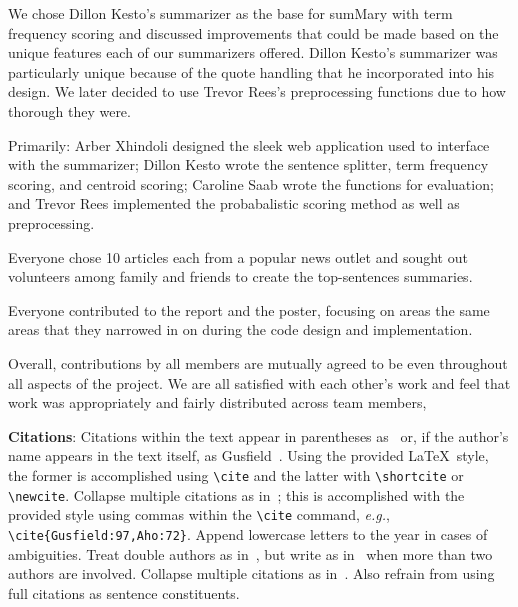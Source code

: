 \documentclass[11pt,a4paper]{article}
\begin{document}
We chose Dillon Kesto's summarizer as the base for sumMary with term frequency scoring and discussed improvements that could be made based on the unique features each of our summarizers offered. Dillon Kesto's summarizer was particularly unique because of the quote handling that he incorporated into his design. We later decided to use Trevor Rees's preprocessing functions due to how thorough they were.

Primarily: Arber Xhindoli designed the sleek web application used to interface with the summarizer; Dillon Kesto wrote the sentence splitter, term frequency scoring, and centroid scoring; Caroline Saab wrote the functions for evaluation; and Trevor Rees implemented the probabalistic scoring method as well as preprocessing.

Everyone chose 10 articles each from a popular news outlet and sought out volunteers among family and friends to create the top-sentences summaries.

Everyone contributed to the report and the poster, focusing on areas the same areas that they narrowed in on during the code design and implementation.

Overall, contributions by all members are mutually agreed to be even throughout all aspects of the project. We are all satisfied with each other's work and feel that work was appropriately and fairly distributed across team members,






















{\bf Citations}: Citations within the text appear in parentheses
as~\cite{Gusfield:97} or, if the author's name appears in the text
itself, as Gusfield~.
Using the provided \LaTeX\ style, the former is accomplished using
{\small\verb|\cite|} and the latter with {\small\verb|\shortcite|} or {\small\verb|\newcite|}. Collapse multiple citations as in~\cite{Gusfield:97,Aho:72}; this is accomplished with the provided style using commas within the {\small\verb|\cite|} command, {\em e.g.}, {\small\verb|\cite{Gusfield:97,Aho:72}|}. Append lowercase letters to the year in cases of ambiguities.  
 Treat double authors as
in~\cite{Aho:72}, but write as in~\cite{Chandra:81} when more than two
authors are involved. Collapse multiple citations as
in~\cite{Gusfield:97,Aho:72}. Also refrain from using full citations
as sentence constituents.
\end{document}

